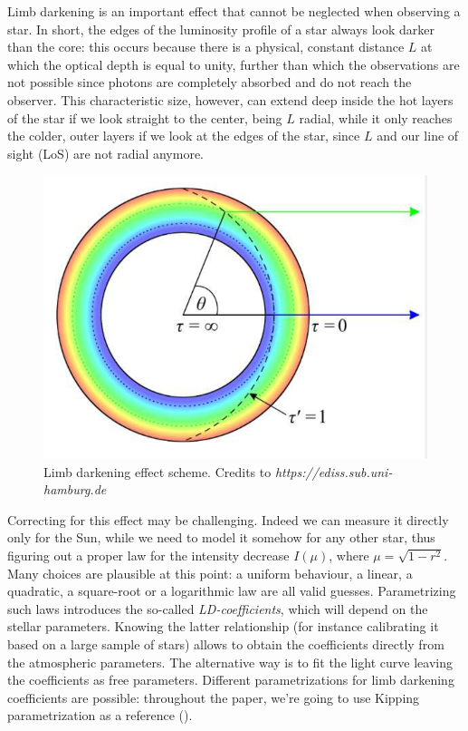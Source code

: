\documentclass{aa}
\begin{document}
Limb darkening is an important effect that cannot be neglected when observing a star.
In short, the edges of the luminosity profile 
of a star always look darker than the core: this occurs because there is a physical, constant 
distance $L$ at which the optical depth is equal to unity, further than which 
the observations are not possible since photons are completely absorbed and do not reach the observer. This characteristic size, 
however, can extend deep inside the hot layers of the star if we look straight 
to the center, being $L$ radial, while it only reaches the colder, outer layers 
if we look at the edges of the star, since $L$ and our line of sight (LoS) are not radial 
anymore.
\begin{figure}[h]
    \centering  
    \includegraphics[scale=0.25, angle=0]{pictures/limb_darkening.png}
    \caption{Limb darkening effect scheme. Credits to \textit{https://ediss.sub.uni-hamburg.de}}
\end{figure}
Correcting for this effect may be challenging. Indeed we can measure it 
directly only for the Sun, while we need to model it somehow for any other 
star, thus figuring out a proper law for the intensity decrease $I(\mu)$, 
where $\mu = \sqrt{1-r^2}$. Many choices are plausible at this point: a 
uniform behaviour, a linear, a quadratic, a square-root or a 
logarithmic law are all valid guesses. Parametrizing such laws introduces 
the so-called \textit{LD-coefficients}, which will depend on the stellar 
parameters. Knowing the latter relationship (for instance calibrating it 
based on a large sample of stars) allows to obtain the coefficients directly 
from the atmospheric parameters. 
The alternative way is to fit the light curve leaving the coefficients as free parameters.
Different parametrizations for limb darkening coefficients are possible: throughout the paper, we're going to use Kipping parametrization as a reference (\cite{Kipping}). 
\end{document}
